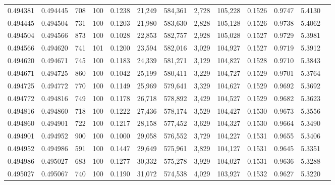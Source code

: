 \begin{tabular}{rrrrrrrrrrrrr}
0.494381 & 0.494445 &   708 & 100 &                                     0.1238 &  21,249 & 584,361 &   2,728 & 105,228 & 0.1526 & 0.9747 & 5.4130 \\
0.494445 & 0.494504 &   731 & 100 &                                     0.1203 &  21,980 & 583,630 &   2,828 & 105,128 & 0.1526 & 0.9738 & 5.4062 \\
0.494504 & 0.494566 &   873 & 100 &                                     0.1028 &  22,853 & 582,757 &   2,928 & 105,028 & 0.1527 & 0.9729 & 5.3981 \\
0.494566 & 0.494620 &   741 & 101 &                                     0.1200 &  23,594 & 582,016 &   3,029 & 104,927 & 0.1527 & 0.9719 & 5.3912 \\
0.494620 & 0.494671 &   745 & 100 &                                     0.1183 &  24,339 & 581,271 &   3,129 & 104,827 & 0.1528 & 0.9710 & 5.3843 \\
0.494671 & 0.494725 &   860 & 100 &                                     0.1042 &  25,199 & 580,411 &   3,229 & 104,727 & 0.1529 & 0.9701 & 5.3764 \\
0.494725 & 0.494772 &   770 & 100 &                                     0.1149 &  25,969 & 579,641 &   3,329 & 104,627 & 0.1529 & 0.9692 & 5.3692 \\
0.494772 & 0.494816 &   749 & 100 &                                     0.1178 &  26,718 & 578,892 &   3,429 & 104,527 & 0.1529 & 0.9682 & 5.3623 \\
0.494816 & 0.494860 &   718 & 100 &                                     0.1222 &  27,436 & 578,174 &   3,529 & 104,427 & 0.1530 & 0.9673 & 5.3556 \\
0.494860 & 0.494901 &   722 & 100 &                                     0.1217 &  28,158 & 577,452 &   3,629 & 104,327 & 0.1530 & 0.9664 & 5.3490 \\
0.494901 & 0.494952 &   900 & 100 &                                     0.1000 &  29,058 & 576,552 &   3,729 & 104,227 & 0.1531 & 0.9655 & 5.3406 \\
0.494952 & 0.494986 &   591 & 100 &                                     0.1447 &  29,649 & 575,961 &   3,829 & 104,127 & 0.1531 & 0.9645 & 5.3351 \\
0.494986 & 0.495027 &   683 & 100 &                                     0.1277 &  30,332 & 575,278 &   3,929 & 104,027 & 0.1531 & 0.9636 & 5.3288 \\
0.495027 & 0.495067 &   740 & 100 &                                     0.1190 &  31,072 & 574,538 &   4,029 & 103,927 & 0.1532 & 0.9627 & 5.3220 \\

\end{tabular}
